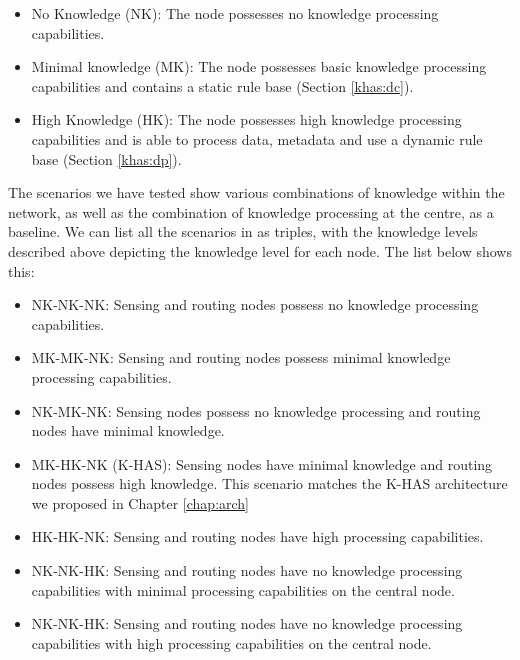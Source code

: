 	\begin{itemize}
		\item No Knowledge (NK): The node possesses no knowledge processing capabilities.
		\item Minimal knowledge (MK): The node possesses basic knowledge processing capabilities and contains a static rule base (Section \ref{khas:dc}).
		\item High Knowledge (HK): The node possesses high knowledge processing capabilities and is able to process data, metadata and use a dynamic rule base (Section \ref{khas:dp}).
	\end{itemize}

The scenarios we have tested show various combinations of knowledge within the network, as well as the combination of knowledge processing at the centre, as a baseline. We can list all the scenarios in as triples, with the knowledge levels described above depicting the knowledge level for each node. The list below shows this:

	\begin{itemize}
		\item NK-NK-NK: Sensing and routing nodes possess no knowledge processing capabilities.
		\item MK-MK-NK: Sensing and routing nodes possess minimal knowledge processing capabilities.
		\item NK-MK-NK: Sensing nodes possess no knowledge processing and routing nodes have minimal knowledge.
		\item MK-HK-NK (K-HAS): Sensing nodes have minimal knowledge and routing nodes possess high knowledge. This scenario matches the K-HAS architecture we proposed in Chapter \ref{chap:arch}
		\item HK-HK-NK: Sensing and routing nodes have high processing capabilities.
		\item NK-NK-HK: Sensing and routing nodes have no knowledge processing capabilities with minimal processing capabilities on the central node.
		\item NK-NK-HK: Sensing and routing nodes have no knowledge processing capabilities with high processing capabilities on the central node.
	\end{itemize}

